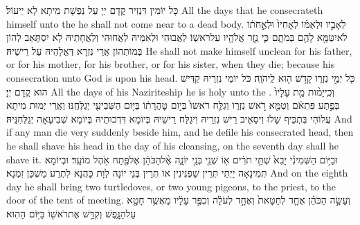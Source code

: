 {כָּל יוֹמִין דִּנְזִיר קֳדָם יְיָ עַל נַפְשָׁת מִיתָא לָא יֵיעוֹל׃}
{All the days that he consecrateth himself unto the \lord\space he shall not come near to a dead body.}{}
{לְאָבִ֣יו וּלְאִמּ֗וֹ לְאָחִיו֙ וּלְאַ֣חֹת֔וֹ לֹא\maqqaf יִטַּמָּ֥א לָהֶ֖ם בְּמֹתָ֑ם כִּ֛י נֵ֥זֶר אֱלֹהָ֖יו עַל\maqqaf רֹאשֽׁוֹ׃}
{לַאֲבוּהִי וּלְאִמֵּיהּ לַאֲחוּהִי וְלַאֲחָתֵיהּ לָא יִסְתָּאַב לְהוֹן בְּמוֹתְהוֹן אֲרֵי נִזְרָא דֶּאֱלָהֵיהּ עַל רֵישֵׁיהּ׃}
{He shall not make himself unclean for his father, or for his mother, for his brother, or for his sister, when they die; because his consecration unto God is upon his head.}{}
{כֹּ֖ל יְמֵ֣י נִזְר֑וֹ קָדֹ֥שׁ ה֖וּא לַֽיהֹוָֽה׃}
{כֹּל יוֹמֵי נִזְרֵיהּ קַדִּישׁ הוּא קֳדָם יְיָ׃}
{All the days of his Naziriteship he is holy unto the \lord.}{}
{וְכִֽי\maqqaf יָמ֨וּת מֵ֤ת עָלָיו֙ בְּפֶ֣תַע פִּתְאֹ֔ם וְטִמֵּ֖א רֹ֣אשׁ נִזְר֑וֹ וְגִלַּ֤ח רֹאשׁוֹ֙ בְּי֣וֹם טׇהֳרָת֔וֹ בַּיּ֥וֹם הַשְּׁבִיעִ֖י יְגַלְּחֶֽנּוּ׃}
{וַאֲרֵי יְמוּת מִיתָא עֲלוֹהִי בִּתְכֵּיף שָׁלוּ וִיסַאֵיב רֵישׁ נִזְרֵיהּ וִיגַלַּח רֵישֵׁיהּ בְּיוֹמָא דִּדְכוּתֵיהּ בְּיוֹמָא שְׁבִיעָאָה יְגַלְּחִנֵּיהּ׃}
{And if any man die very suddenly beside him, and he defile his consecrated head, then he shall shave his head in the day of his cleansing, on the seventh day shall he shave it.}{}
{וּבַיּ֣וֹם הַשְּׁמִינִ֗י יָבִא֙ שְׁתֵּ֣י תֹרִ֔ים א֥וֹ שְׁנֵ֖י בְּנֵ֣י יוֹנָ֑ה אֶ֨ל\maqqaf הַכֹּהֵ֔ן אֶל\maqqaf פֶּ֖תַח אֹ֥הֶל מוֹעֵֽד׃}
{וּבְיוֹמָא תְּמִינָאָה יַיְתֵי תְּרֵין שַׁפְנִינִין אוֹ תְּרֵין בְּנֵי יוֹנָה לְוָת כָּהֲנָא לִתְרַע מַשְׁכַּן זִמְנָא׃}
{And on the eighth day he shall bring two turtledoves, or two young pigeons, to the priest, to the door of the tent of meeting.}{}
{וְעָשָׂ֣ה הַכֹּהֵ֗ן אֶחָ֤ד לְחַטָּאת֙ וְאֶחָ֣ד לְעֹלָ֔ה וְכִפֶּ֣ר עָלָ֔יו מֵאֲשֶׁ֥ר חָטָ֖א עַל\maqqaf הַנָּ֑פֶשׁ וְקִדַּ֥שׁ אֶת\maqqaf רֹאשׁ֖וֹ בַּיּ֥וֹם הַהֽוּא׃}
